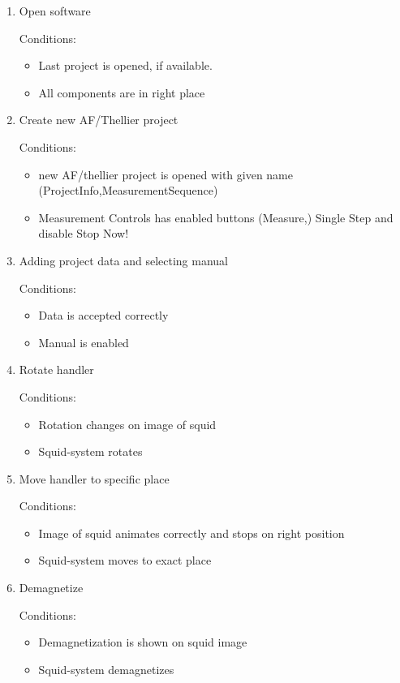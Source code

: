 \begin{enumerate}

\item Open software

Conditions:
\begin{itemize}
\item Last project is opened, if available.
\item All components are in right place
\end{itemize}

\item Create new AF/Thellier project

Conditions:
\begin{itemize}
\item new AF/thellier project is opened with given name (ProjectInfo,MeasurementSequence)
\item Measurement Controls has enabled buttons (Measure,) Single Step and disable Stop Now!
\end{itemize}

\item Adding project data and selecting manual

Conditions:
\begin{itemize}
\item Data is accepted correctly
\item Manual is enabled
\end{itemize}

\item Rotate handler

Conditions:
\begin{itemize}
\item Rotation changes on image of squid
\item Squid-system rotates
\end{itemize}

\item Move handler to specific place

Conditions:
\begin{itemize}
\item Image of squid animates correctly and stops on right position
\item Squid-system moves to exact place
\end{itemize}

\item Demagnetize

Conditions:
\begin{itemize}
\item Demagnetization is shown on squid image
\item Squid-system demagnetizes
\end{itemize}


\end{enumerate}
